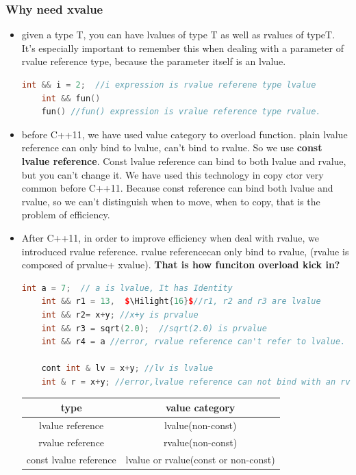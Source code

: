 \documentclass[a4paper,12pt,twoside]{book}
\newcommand{\Hilight}[1]{\makebox[0pt][l]{\color{yellow}\rule[-3pt]{#1em}{11pt}}}
\begin{document}
\subsubsection{Why need xvalue}
\begin{itemize}
	\item given a type T, you can have lvalues of type T as well as rvalues of typeT. It's especially important to remember this when dealing with a parameter of rvalue reference type, because the parameter itself is an lvalue.
	\begin{lstlisting}[frame=single, language=c++, mathescape=true]
	int && i = 2;  //i expression is rvalue referene type lvalue
	int && fun()
	fun() //fun() expression is vralue reference type rvalue. 
	\end{lstlisting}
	
	\item before C++11, we have used value category to overload function. plain lvalue reference can only bind to lvalue, can't bind to rvalue. So we use \textbf{const lvalue reference}.  Const lvalue reference can bind to both lvalue and rvalue, but you can't change it. We have used this technology in copy ctor very common before C++11. Because const reference can bind both lvalue and rvalue, so we can't distinguish when to move, when to copy, that is the problem of efficiency.
	
	\item After C++11, in order to improve efficiency when deal with rvalue, we introduced rvalue reference.  rvalue referencecan only bind to rvalue, (rvalue is composed of prvalue+ xvalue). \textbf{That is how funciton overload kick in?}
	
	\begin{lstlisting}[frame=single, language=c++, mathescape=true]
	int a = 7;  // a is lvalue, It has Identity
	int && r1 = 13,  $\Hilight{16}$//r1, r2 and r3 are lvalue
	int && r2= x+y; //x+y is prvalue
	int && r3 = sqrt(2.0);  //sqrt(2.0) is prvalue
	int && r4 = a //error, rvalue reference can't refer to lvalue.
	
	cont int & lv = x+y; //lv is lvalue
	int & r = x+y; //error,lvalue reference can not bind with an rvalue.
	\end{lstlisting}
	
	\begin{tabular}{|c|c|}
		\hline 
		type & value category \\ 
		\hline 
		lvalue reference & lvalue(non-const)  \\ 
		\hline 
		rvalue reference &  rvalue(non-const)\\ 
		\hline 
		const lvalue reference & lvalue or rvalue(const or non-const)  \\ 
		\hline 
	\end{tabular} 
	

\end{itemize}
\end{document}
